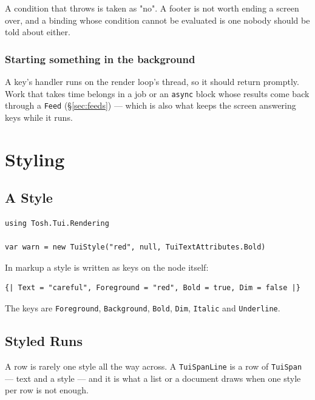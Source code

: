 \documentclass[11pt,a4paper,twoside,openany]{book}
\newcommand{\code}[1]{\texttt{\small #1}}
\begin{document}
\begin{tipbox}
A condition that throws is taken as "no". A footer is not worth ending a screen
over, and a binding whose condition cannot be evaluated is one nobody should be
told about either.
\end{tipbox}

\subsection{Starting something in the background}

A key's handler runs on the render loop's thread, so it should return promptly. Work
that takes time belongs in a job or an \code{async} block whose results come back
through a \code{Feed} (\S\ref{sec:feeds}) --- which is also what keeps the screen
answering keys while it runs.

\chapter{Styling}

\section{A Style}

\begin{lstlisting}
using Tosh.Tui.Rendering

var warn = new TuiStyle("red", null, TuiTextAttributes.Bold)
\end{lstlisting}

In markup a style is written as keys on the node itself:

\begin{lstlisting}
{| Text = "careful", Foreground = "red", Bold = true, Dim = false |}
\end{lstlisting}

The keys are \code{Foreground}, \code{Background}, \code{Bold}, \code{Dim},
\code{Italic} and \code{Underline}.

\section{Styled Runs}

A row is rarely one style all the way across. A \code{TuiSpanLine} is a row of
\code{TuiSpan} --- text and a style --- and it is what a list or a document draws
when one style per row is not enough.
\end{document}
